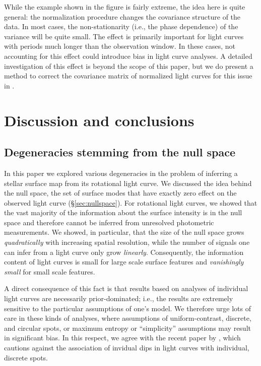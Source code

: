 \documentclass[modern]{aastex62}
\begin{document}
While the example shown in the figure is fairly extreme, the idea here
is quite general: the normalization procedure changes the covariance
structure of the data. In most cases, the non-stationarity (i.e., the
phase dependence) of the variance will be quite small. The effect is primarily
important for light curves with periods much longer than
the observation window. In these cases, not accounting for this effect
could introduce bias in light curve analyses. A detailed investigation of
this effect is beyond the scope of this paper, but we do present a
method to correct the covariance matrix of normalized light curves for
this issue in .

\section{Discussion and conclusions}

\subsection{Degeneracies stemming from the null space}

In this paper we explored various degeneracies in the problem of
inferring a stellar surface map from its rotational light curve.
We discussed the idea behind the null space, the set of surface modes that
have exactly zero effect on the observed light curve (\S\ref{sec:nullspace}).
For rotational light curves, we showed that the vast majority of the information
about the surface intensity is in the null space and therefore cannot
be inferred from unresolved photometric measurements. We showed, in particular,
that the size of the null space grows \emph{quadratically} with increasing spatial
resolution, while the number of signals one can infer from a light curve
only grow \emph{linearly}. Consequently, the information content of light
curves is small for large scale surface features and \emph{vanishingly small}
for small scale features.

A direct consequence of this fact is that results based on analyses
of individual light curves are necessarily prior-dominated; i.e.,
the results are extremely sensitive to
the particular assumptions of one's model. We therefore urge lots of care
in these kinds of analyses, where assumptions of uniform-contrast, discrete, and
circular spots, or maximum entropy or ``simplicity'' assumptions may
result in significant bias. In this respect, we agree with the recent
paper by \citep{Basri2020}, which cautions against the association of
invidual dips in light curves with individual, discrete spots.
\end{document}

